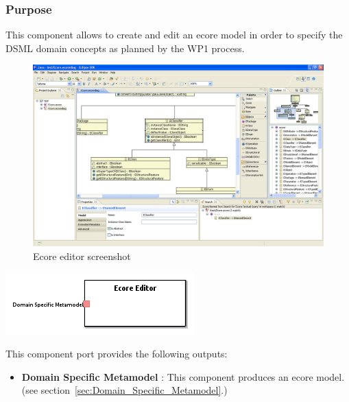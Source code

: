 \documentclass{gemoc} %
\begin{document}

\subsubsection{Purpose}
This component allows to create and edit an ecore model in order to specify the DSML domain concepts as planned by the WP1 process.
\begin{figure}[h]
	\begin{center}
	\includegraphics*[trim=0.0cm 0.0cm 0cm 0.0cm, clip=true, width=1.0\linewidth]{../images/EcoreDiagramOverview.png}
	\caption{Ecore editor screenshot}
	\end{center}
\end{figure}

\begin{center}
\includegraphics*[trim=0.0cm 0.0cm 0cm 0.0cm, clip=true]{../images/generated/Generated_Ecore_Editor.png}
\end{center}


This component port provides the following outputs:
\begin{itemize}
  \item \textbf{Domain Specific Metamodel} :
This component produces an ecore model.
(see section~\ref{sec:Domain_Specific_Metamodel}.)
\end{itemize}
\end{document}
